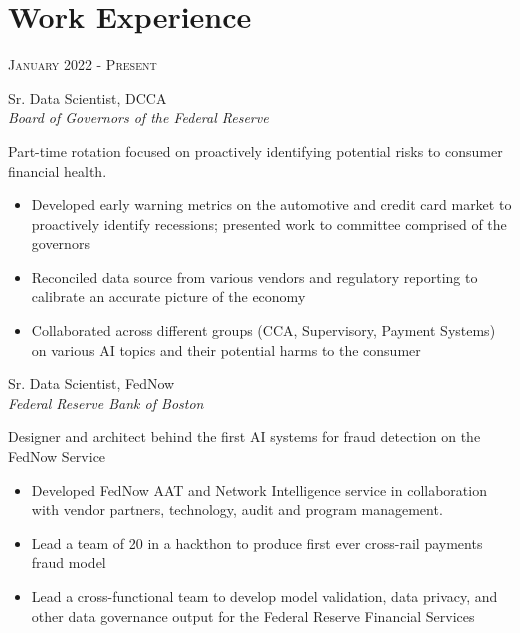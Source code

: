 \documentclass[10pt]{article} %
\begin{document}
\begin{minipage}[t]{0.5\textwidth} %
\vspace{0pt} %
	

\section{Work Experience} 

{\raggedleft\textsc{January 2022 - Present}\par}

{\raggedright\large Sr. Data Scientist,  DCCA\\ 
\textit{Board of Governors of the Federal Reserve}\\[5pt]}

\normalsize{Part-time rotation focused on proactively identifying potential risks to consumer financial health.   \\
\begin{itemize}
\item Developed early warning metrics on the automotive and credit card market to proactively identify recessions; presented work to committee comprised of the governors
\item Reconciled data source from various vendors and regulatory reporting to calibrate an accurate picture of the economy 
\item Collaborated across different groups (CCA, Supervisory, Payment Systems) on various AI topics and their potential harms to the consumer
\end{itemize}}

{\raggedright\large Sr. Data Scientist,  FedNow\\ 
\textit{Federal Reserve Bank of Boston}\\[5pt]}

\normalsize{Designer and architect behind the first AI systems for fraud detection on the FedNow Service     \\

\begin{itemize}
\item Developed FedNow AAT and Network Intelligence service in collaboration with vendor partners, technology, audit and program management. 
\item Lead a team of 20 in a hackthon to produce first ever cross-rail payments fraud model 
\item Lead a cross-functional team to develop model validation, data privacy, and other data governance output for the Federal Reserve Financial Services
\end{itemize}}


\end{minipage}
\end{document}
